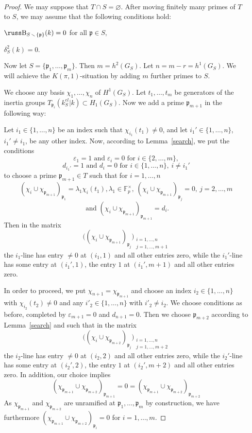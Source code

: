 \documentclass[10pt]{article}
\newcommand{\F}{{\mathbb F}}
\newcommand{\p}{{\mathfrak p}}
\newcommand{\sm}{{\,\smallsetminus\,}}
\def\Be{\hbox{\russ\char66}}
\theoremstyle{alex}
\theoremstyle{alexdef}
\begin{document}
\begin{proof}
We may suppose that $T\cap S=\varnothing$.
After moving finitely many primes of $T$ to $S$, we may assume that the following conditions hold:

\medskip\noindent
\begin{compactitem}
\item $\Be_{S\sm \{\p\}}(k)=0$ for all $\p\in S$,\smallskip
\item $\delta_S^2(k)=0$.
\end{compactitem}

\medskip\noindent
Now let $S=\{\p_1,\ldots,\p_m\}$. Then $m=h^2(G_S)$. Let $n=m-r=h^1(G_S)$. We will achieve the $K(\pi,1)$-situation by adding $m$ further primes to $S$.

We choose any basis $\chi_1,\ldots, \chi_n$ of $H^1(G_S)$. Let $t_1,\ldots,t_m$ be generators of the inertia groups $T_{\p_i}(k_S^{el}|k)\subset H_1(G_S)$.  Now we add a prime $\p_{m+1}$ in the following way:

Let $i_1 \in \{1,\ldots, n\}$ be an index such that $\chi_{i_1}(t_1)\neq 0$, and let $i_1' \in \{1,\ldots, n\}$, $i_1'\neq i_1$, be any other index. Now, according to Lemma~\ref{search},  we put the conditions
\[
\varepsilon_1=1  \text{ and } \varepsilon_i=0 \text{ for } i\in \{2,\ldots,m\},
\]
\[
 d_{i_1'}=1 \text{ and } d_i=0 \text{ for } i\in \{1,\ldots,n\},\ i\neq i_1'
\]
to choose a prime $\p_{m+1}\in T$  such that for $i=1,\ldots, n$
\[
(\chi_i \cup \chi_{\p_{m+1}})_{\p_1}= \lambda_1 \chi_i(t_1), \lambda_1 \in \F_p^\times,\  (\chi_i \cup \chi_{\p_{m+1}})_{\p_j}=0,\ j=2,\ldots,m
\]
\[
\text{ and } (\chi_i \cup \chi_{\p_{m+1}})_{\p_{m+1}}=d_i.
\]
Then in the matrix
\[
\Big( (\chi_i\cup \chi_{\p_{m+1}})_{\p_j}\Big)_{\substack{
i=1,\ldots,n\\ j=1,\ldots, m+1}}
\]
the $i_1$-line has entry $\neq 0$ at $(i_1,1)$ and all other entries zero, while the $i_1'$-line has some entry at $(i_1',1)$, the entry $1$ at $(i_1',m+1)$ and all other entries zero.

In order to proceed, we put $\chi_{n+1}=\chi_{\p_{m+1}}$ and choose an index $i_2\in \{1,\ldots,n\}$ with $\chi_{i_2}(t_2)\neq 0$ and any  $i'_2\in \{1,\ldots,n\}$ with $i'_2\neq i_2$. We choose conditions as before, completed by $\varepsilon_{m+1}=0$ and $d_{n+1}=0$. Then we choose $\p_{m+2}$ according to Lemma~\ref{search} and such that in the matrix
\[
\Big( (\chi_i\cup \chi_{\p_{m+2}})_{\p_j}\Big)_{\substack{
i=1,\ldots,n\\ j=1,\ldots, m+2}}
\]
the $i_2$-line has entry $\neq 0$ at $(i_2,2)$ and all other entries zero, while the $i_2'$-line has some entry at $(i_2',2)$, the entry $1$ at $(i_2',m+2)$ and all other entries zero. In addition, our choice implies
\[
(\chi_{\p_{m+1}} \cup \chi_{\p_{m+2}})_{\p_{m+1}}=0= (\chi_{\p_{m+1}} \cup \chi_{\p_{m+2}})_{\p_{m+2}}
\]
As $\chi_{\p_{m+1}}$ and $\chi_{\p_{m+2}}$ are unramified at $\p_1,\ldots,\p_m$ by construction, we have furthermore $(\chi_{\p_{m+1}} \cup \chi_{\p_{m+2}})_{\p_{i}}=0$ for $i=1,\ldots,m$.


\end{proof}
\end{document}
